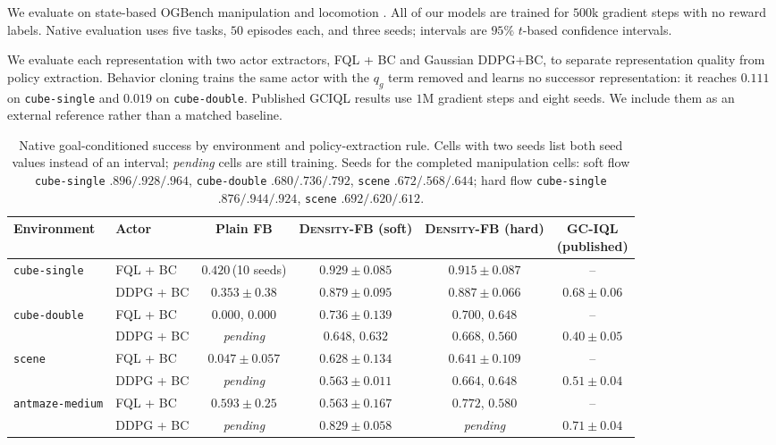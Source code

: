 \documentclass{article}
\newcommand{\DensityFB}{\textsc{Density-FB}}
\begin{document}
We evaluate on state-based OGBench manipulation and locomotion
\citep{park2024ogbench}.
All of our models are trained for $500$k gradient steps with no reward labels.
Native evaluation uses five tasks, $50$ episodes each, and three seeds; intervals are $95\%$ $t$-based confidence intervals.

We evaluate each representation with two actor extractors, FQL + BC and Gaussian DDPG+BC, to separate representation quality from policy extraction.
Behavior cloning trains the same actor with the $q_g$ term removed and learns no successor representation: it reaches $0.111$ on \texttt{cube-single} and $0.019$ on \texttt{cube-double}.
Published GCIQL results use $1$M gradient steps and eight seeds.
We include them as an external reference rather than a matched baseline.

\begin{table}[h]
\centering
\small
\setlength{\tabcolsep}{3pt}
\begin{tabular}{llcccc}
\toprule
Environment & Actor & Plain FB & \DensityFB{} (soft) & \DensityFB{} (hard) & \shortstack{GC-IQL\\(published)} \\
\midrule
\texttt{cube-single}
& FQL + BC
& $0.420$\,(10 seeds)
& $\mathbf{0.929 \pm 0.085}$
& $0.915 \pm 0.087$
& -- \\

& DDPG + BC
& $0.353 \pm 0.38$
& $0.879 \pm 0.095$
& $0.887 \pm 0.066$
& $0.68 \pm 0.06$ \\
\midrule

\texttt{cube-double}
& FQL + BC
& $0.000$, $0.000$
& $\mathbf{0.736 \pm 0.139}$
& $0.700$, $0.648$
& -- \\

& DDPG + BC
& \emph{pending}
& $0.648$, $0.632$
& $0.668$, $0.560$
& $0.40 \pm 0.05$ \\
\midrule

\texttt{scene}
& FQL + BC
& $0.047 \pm 0.057$
& $0.628 \pm 0.134$
& $\mathbf{0.641 \pm 0.109}$
& -- \\

& DDPG + BC
& \emph{pending}
& $0.563 \pm 0.011$
& $0.664$, $0.648$
& $0.51 \pm 0.04$ \\
\midrule

\texttt{antmaze-medium}
& FQL + BC
& $0.593 \pm 0.25$
& $0.563 \pm 0.167$
& $0.772$, $0.580$
& -- \\

& DDPG + BC
& \emph{pending}
& $\mathbf{0.829 \pm 0.058}$
& \emph{pending}
& $0.71 \pm 0.04$ \\
\bottomrule
\end{tabular}

\caption{
Native goal-conditioned success by environment and policy-extraction rule.
Cells with two seeds list both seed values instead of an interval; \emph{pending} cells are still training.
Seeds for the completed manipulation cells:
soft flow \texttt{cube-single} $.896/.928/.964$,
\texttt{cube-double} $.680/.736/.792$,
\texttt{scene} $.672/.568/.644$;
hard flow \texttt{cube-single} $.876/.944/.924$,
\texttt{scene} $.692/.620/.612$.
}
\label{tab:main}
\end{table}
\end{document}
